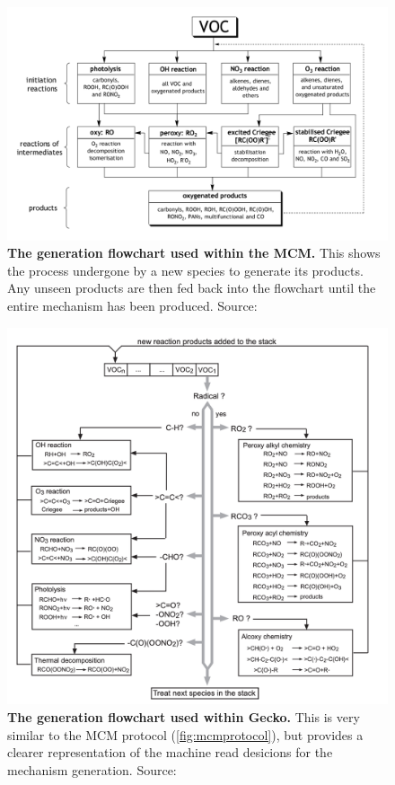 \begin{figure}[H]
     \centering
         \centering
         \includegraphics[width=.96\textwidth]{mcmproto.png}
         \caption{\textbf{The generation flowchart used within the MCM.} This shows the process undergone by a new species to generate its products. Any unseen products are then fed back into the flowchart until the entire mechanism has been produced.  Source:\citep{mcmpartA}}
         \label{fig:mcmprotocol}
     \end{figure}


     \begin{figure}[]
          \centering
              \centering
              \includegraphics[width=.96\textwidth]{figures_c1/generation.png}
              \caption{\textbf{The generation flowchart used within Gecko.} This is very similar to the MCM protocol (\autoref{fig:mcmprotocol}), but provides a clearer representation of the machine read desicions for the mechanism generation.  Source:\citep{protocol}}
              \label{fig:protocol}
          \end{figure}

